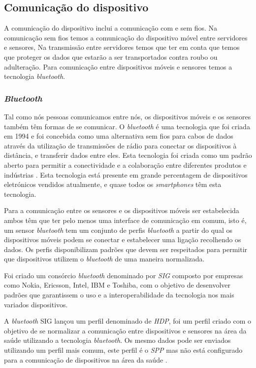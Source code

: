 \subsection{Comunicação do dispositivo}
A comunicação do dispositivo inclui a comunicação com e sem fios. Na comunicação sem fios temos a comunicação do dispositivo móvel entre servidores e sensores, Na transmissão entre servidores temos que ter em conta que temos que proteger os dados que estarão a ser transportados contra roubo ou adulteração. Para comunicação entre dispositivos móveis e sensores temos a tecnologia \textit{bluetooth}.


\subsubsection{\textit{Bluetooth}}
Tal como nós pessoas comunicamos entre nós, os dispositivos móveis e os sensores também têm formas de se comunicar. %
O \textit{bluetooth} é uma tecnologia que foi criada em 1994 e foi concebida como uma alternativa sem fios para cabos de dados através da utilização de transmissões de rádio para conectar os dispositivos à distância, e transferir dados entre eles. Esta tecnologia foi criada como um padrão aberto para permitir a conectividade e a colaboração entre diferentes produtos e indústrias \cite{bluetooth}.
Esta tecnologia está presente em grande percentagem de dispositivos eletrónicos vendidos atualmente, e quase todos os \textit{smartphones} têm esta tecnologia.
\par 
Para a comunicação entre os sensores e os dispositivos móveis ser estabelecida ambos têm que ter pelo menos uma interface de comunicação em comum, isto é, um sensor \textit{bluetooth} tem um conjunto de perfis \textit{bluetooth} a partir do qual os dispositivos móveis podem se conectar e estabelecer uma ligação recolhendo os dados. 
Os perfis disponibilizam padrões que devem ser respeitados para permitir que dispositivos utilizem o \textit{bluetooth} de uma maneira normalizada. 
\par 
Foi criado um consórcio \textit{bluetooth} denominado por \textit{ \gls{SIG} } composto por empresas como Nokia, Ericsson, Intel, IBM e Toshiba, com o objetivo de desenvolver padrões que garantissem o uso e a interoperabilidade da tecnologia nos mais variados dispositivos.
\par
A \textit{bluetooth} \gls{SIG} lançou um perfil denominado de \textit{\gls{HDP}}, foi um perfil criado com o objetivo de se normalizar a comunicação entre dispositivos e sensores na área da saúde utilizando a tecnologia \textit{bluetooth}. Os mesmo dados pode ser enviados utilizando um perfil mais comum, este perfil é o \textit{\gls{SPP}} mas não está configurado para a comunicação de dispositivos na área da saúde \cite{bt-article}.



